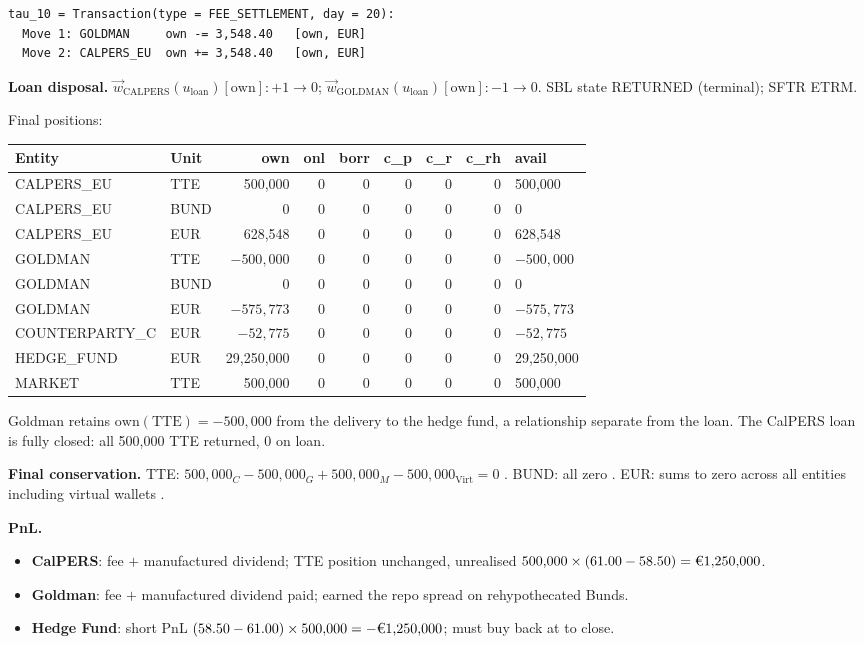 \begin{lstlisting}
tau_10 = Transaction(type = FEE_SETTLEMENT, day = 20):
  Move 1: GOLDMAN     own -= 3,548.40   [own, EUR]
  Move 2: CALPERS_EU  own += 3,548.40   [own, EUR]
\end{lstlisting}

\noindent\textbf{Loan disposal.} $\vec{w}_{\text{CALPERS}}(u_{\mathrm{loan}})[\mathrm{own}]\!: +1 \to 0$; $\vec{w}_{\text{GOLDMAN}}(u_{\mathrm{loan}})[\mathrm{own}]\!: -1 \to 0$. SBL state RETURNED (terminal); SFTR ETRM.

Final positions:

\begin{center}\small
\begin{tabular}{l l r r r r r r l}
\toprule
\textbf{Entity} & \textbf{Unit} & own & onl & borr & c\_p & c\_r & c\_rh & avail \\
\midrule
CALPERS\_EU & TTE & 500{,}000 & 0 & 0 & 0 & 0 & 0 & 500{,}000 \\
CALPERS\_EU & BUND & 0 & 0 & 0 & 0 & 0 & 0 & 0 \\
CALPERS\_EU & EUR & 628{,}548 & 0 & 0 & 0 & 0 & 0 & 628{,}548 \\
GOLDMAN & TTE & $-500{,}000$ & 0 & 0 & 0 & 0 & 0 & $-500{,}000$ \\
GOLDMAN & BUND & 0 & 0 & 0 & 0 & 0 & 0 & 0 \\
GOLDMAN & EUR & $-575{,}773$ & 0 & 0 & 0 & 0 & 0 & $-575{,}773$ \\
COUNTERPARTY\_C & EUR & $-52{,}775$ & 0 & 0 & 0 & 0 & 0 & $-52{,}775$ \\
HEDGE\_FUND & EUR & 29{,}250{,}000 & 0 & 0 & 0 & 0 & 0 & 29{,}250{,}000 \\
MARKET & TTE & 500{,}000 & 0 & 0 & 0 & 0 & 0 & 500{,}000 \\
\bottomrule
\end{tabular}
\end{center}

\noindent Goldman retains $\mathrm{own}(\text{TTE}) = -500{,}000$ from the delivery to the hedge fund, a relationship separate from the loan. The CalPERS loan is fully closed: all 500{,}000 TTE returned, 0 on loan.

\noindent\textbf{Final conservation.} TTE: $500{,}000_C - 500{,}000_G + 500{,}000_M - 500{,}000_{\mathrm{Virt}} = 0$ \checkmark. BUND: all zero \checkmark. EUR: sums to zero across all entities including virtual wallets \checkmark.

\noindent\textbf{PnL.}
\begin{itemize}[nosep]
\item \textbf{CalPERS}:  fee $+$  manufactured dividend; TTE position unchanged, unrealised $500{,}000 \times (61.00 - 58.50) = \text{\EUR{1,250,000}}$.
\item \textbf{Goldman}:  fee $+$  manufactured dividend paid; earned the repo spread on rehypothecated Bunds.
\item \textbf{Hedge Fund}: short PnL $(58.50 - 61.00) \times 500{,}000 = -\text{\EUR{1,250,000}}$; must buy back at  to close.
\end{itemize}

